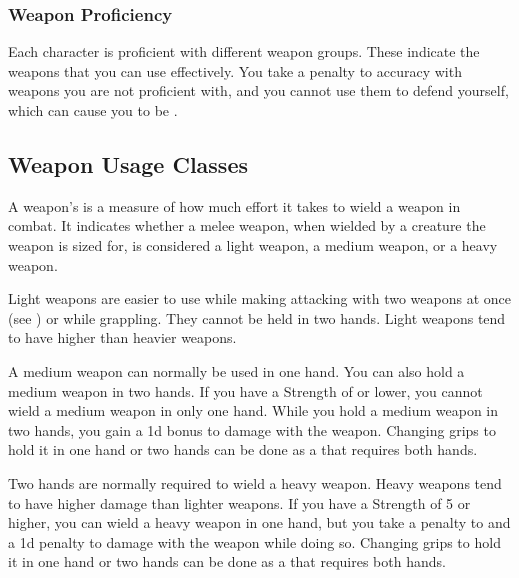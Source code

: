         \subsubsection{Weapon Proficiency}\label{Weapon Proficiency}
            Each character is proficient with different weapon groups. These indicate the weapons that you can use effectively. You take a  penalty to accuracy with weapons you are not proficient with, and you cannot use them to defend yourself, which can cause you to be .

    \subsection{Weapon Usage Classes}\label{Weapon Usage Classes}
        A weapon's  is a measure of how much effort it takes to wield a weapon in combat.
        It indicates whether a melee weapon, when wielded by a creature the weapon is sized for, is considered a light weapon, a medium weapon, or a heavy weapon.


        \label{Light Weapons} Light weapons are easier to use while making attacking with two weapons at once (see ) or while grappling.
        They cannot be held in two hands.
        Light weapons tend to have higher  than heavier weapons.

         A medium weapon can normally be used in one hand.
        You can also hold a medium weapon in two hands.
        If you have a Strength of  or lower, you cannot wield a medium weapon in only one hand.
        While you hold a medium weapon in two hands, you gain a \plus1d bonus to damage with the weapon.
        Changing grips to hold it in one hand or two hands can be done as a  that requires both hands.

         Two hands are normally required to wield a heavy weapon.
        Heavy weapons tend to have higher damage than lighter weapons.
        If you have a Strength of 5 or higher, you can wield a heavy weapon in one hand, but you take a  penalty to  and a \minus1d penalty to damage with the weapon while doing so.
        Changing grips to hold it in one hand or two hands can be done as a  that requires both hands.

